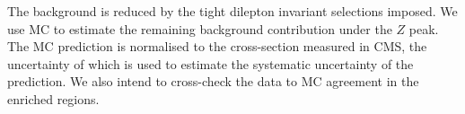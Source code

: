 The \ww{} background is reduced by the tight dilepton invariant selections imposed. 
We use MC to estimate the remaining background contribution under the $Z$ peak. 
The MC prediction is normalised to the cross-section measured in CMS, the uncertainty 
of which is used to estimate the systematic uncertainty of the prediction. 
We also intend to cross-check the data to MC agreement in the \ww{} enriched regions. 
